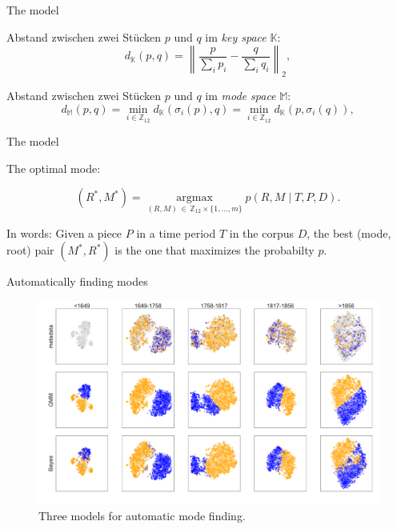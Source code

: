 \begin{frame}{The model}

    Abstand zwischen zwei Stücken $p$ und $q$ im \emph{key space} $\mathbb K$:
    \begin{equation}
        d_{\mathbb K} (p,q) = \left\| \frac{p}{\sum_i p_i} - \frac{q}{\sum_i q_i} \right\|_2,
    \end{equation}

    \pause

    Abstand zwischen zwei Stücken $p$ und $q$ im \emph{mode space} $\mathbb M$:
    \begin{equation}
        d_\mathbb M (p,q) =
        \min_{i\in\mathbb Z_{12}} d_{\mathbb K}(\sigma_i(p), q) = \min_{i\in\mathbb Z_{12}} d_{\mathbb K}(p, \sigma_{i}(q)),
    \end{equation}
\end{frame}

\begin{frame}{The model}

    The optimal mode:

    \begin{equation}\label{map_key}
        (R^*,M^*)= \operatorname*{argmax}_{(R,M)\,\in\,\mathbb Z_{12}\times\{1, \ldots, m\}} p(R,M\mid T,P,D).
    \end{equation}
    
    In words: Given a piece $P$ in a time period $T$ in the corpus $D$, the best (mode, root) pair $(M^*, R^*)$ is the one
    that maximizes the probabilty $p$.
\end{frame}

\begin{frame}{Automatically finding modes}
    \begin{figure}
        \centering
        \includegraphics[width=\linewidth,height=.8\textheight,keepaspectratio]{_images/Figure4.pdf}
        \caption{Three models for automatic mode finding.}
    \end{figure}
\end{frame}

